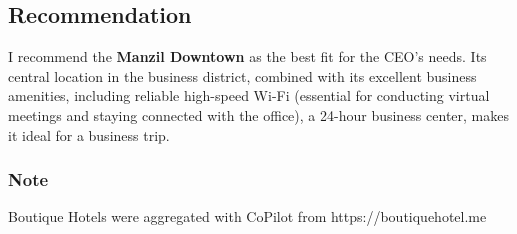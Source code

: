\documentclass{article}
\begin{document}
\subsection*{Recommendation}
I recommend the \textbf{Manzil Downtown} as the best fit for the CEO's needs. Its central location in the business district, combined with its excellent business amenities, including reliable high-speed Wi-Fi (essential for conducting virtual meetings and staying connected with the office), a 24-hour business center, makes it ideal for a business trip.

\subsubsection*{Note}
Boutique Hotels were aggregated with CoPilot from https://boutiquehotel.me
\end{document}
